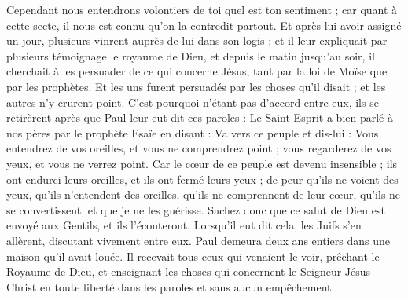\begin{multicols}{2}
Cependant nous entendrons volontiers de toi quel est ton sentiment ; car quant à cette secte, il nous est connu qu'on la contredit partout.
Et après lui avoir assigné un jour, plusieurs vinrent auprès de lui dans son logis ; et il leur expliquait par plusieurs témoignage le royaume de Dieu, et depuis le matin jusqu'au soir, il cherchait à les persuader de ce qui concerne Jésus, tant par la loi de Moïse que par les prophètes.
Et les uns furent persuadés par les choses qu'il disait ; et les autres n'y crurent point.
C'est pourquoi n'étant pas d'accord entre eux, ils se retirèrent après que Paul leur eut dit ces paroles : Le Saint-Esprit a bien parlé à nos pères par le prophète Esaïe en disant :
Va vers ce peuple et dis-lui : Vous entendrez de vos oreilles, et vous ne comprendrez point ; vous regarderez de vos yeux, et vous ne verrez point.
Car le cœur de ce peuple est devenu insensible ; ils ont endurci leurs oreilles, et ils ont fermé leurs yeux ; de peur qu'ils ne voient des yeux, qu'ils n'entendent des oreilles, qu'ils ne comprennent de leur cœur, qu'ils ne se convertissent, et que je ne les guérisse.
Sachez donc que ce salut de Dieu est envoyé aux Gentils, et ils l’écouteront.
Lorsqu’il eut dit cela, les Juifs s’en allèrent, discutant vivement entre eux.
Paul demeura deux ans entiers dans une maison qu'il avait louée. Il recevait tous ceux qui venaient le voir,
prêchant le Royaume de Dieu, et enseignant les choses qui concernent le Seigneur Jésus-Christ en toute liberté dans les paroles et sans aucun empêchement.

\PPE{}
\end{multicols}
